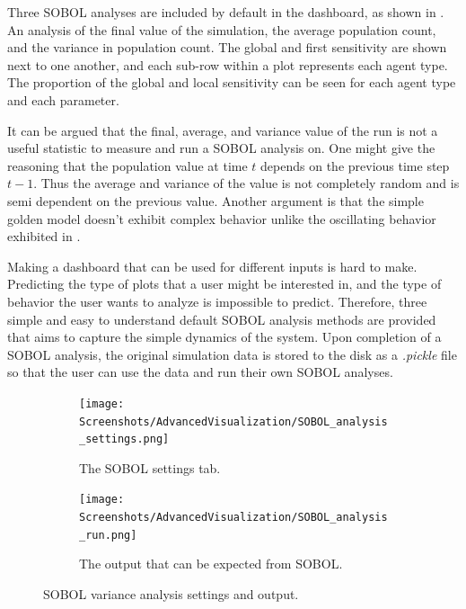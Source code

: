 Three SOBOL analyses are included by default in the dashboard, as shown in .
An analysis of the final value of the simulation, the average population count, and the variance in population count.
The global and first sensitivity are shown next to one another, and each sub-row within a plot represents each agent type. 
The proportion of the global and local sensitivity can be seen for each agent type and each parameter.

It can be argued that the final, average, and variance value of the run is not a useful statistic to measure and run a SOBOL analysis on. 
One might give the reasoning that the population value at time $t$ depends on the previous time step $t-1$. 
Thus the average and variance of the value is not completely random and is semi dependent on the previous value. 
Another argument is that the simple golden model doesn't exhibit complex behavior unlike the oscillating behavior exhibited in . 

Making a dashboard that can be used for different inputs is hard to make. Predicting the type of plots that a user might be interested in, and the type of behavior the user wants to analyze is impossible to predict. 
Therefore, three simple and easy to understand default SOBOL analysis methods are provided that aims to capture the simple dynamics of the system. 
Upon completion of a SOBOL analysis, the original simulation data is stored to the disk as a \textit{.pickle} file so that the user can use the data and run their own SOBOL analyses. 

\begin{figure}[h!]
    \centering
    \begin{subfigure}{0.49\linewidth}
        \centering
        \captionsetup{width=1\linewidth}
        \texttt{[image: Screenshots/AdvancedVisualization/SOBOL\_analysis\_settings.png]}
        \caption{
            The SOBOL settings tab. 
        }
        \label{fig:ss:av:SOBOL_analysis_settings}
    \end{subfigure}
    \hfill
    \begin{subfigure}{0.49\linewidth}
        \centering
        \captionsetup{width=1\linewidth}
        \texttt{[image: Screenshots/AdvancedVisualization/SOBOL\_analysis\_run.png]}
        \caption{
            The output that can be expected from SOBOL. 
        }
        \label{fig:ss:av:SOBOL_analysis_run}
    \end{subfigure}
    \caption{SOBOL variance analysis settings and output. }
\end{figure}


